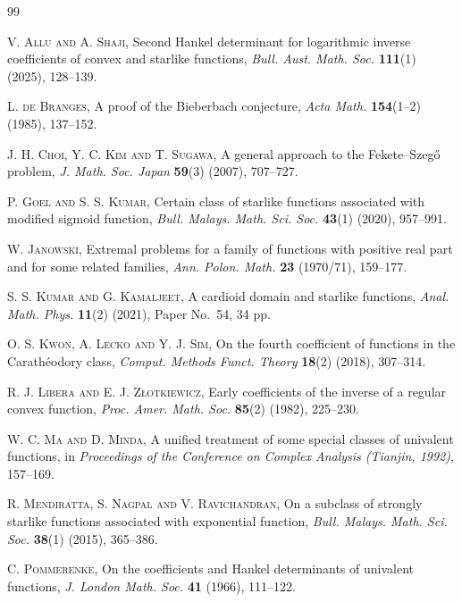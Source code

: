 \documentclass[a4paper,12pt,reqno]{amsart} %
\numberwithin{equation}{section}
\theoremstyle{definition}
\begin{document}
\begin{thebibliography}{99}
	
	\textsc{V. Allu and A. Shaji},
	Second Hankel determinant for logarithmic inverse coefficients of convex and starlike functions,
	\textit{Bull. Aust. Math. Soc.} \textbf{111}(1) (2025), 128--139.
	
	\textsc{L. de Branges},
	A proof of the Bieberbach conjecture,
	\textit{Acta Math.} \textbf{154}(1--2) (1985), 137--152.
	
	\textsc{J. H. Choi, Y. C. Kim and T. Sugawa},
	A general approach to the Fekete--Szeg\H{o} problem,
	\textit{J. Math. Soc. Japan} \textbf{59}(3) (2007), 707--727.
	
	\textsc{P. Goel and S. S. Kumar},
	Certain class of starlike functions associated with modified sigmoid function,
	\textit{Bull. Malays. Math. Sci. Soc.} \textbf{43}(1) (2020), 957--991.
	
	\textsc{W. Janowski},
	Extremal problems for a family of functions with positive real part and for some related families,
	\textit{Ann. Polon. Math.} \textbf{23} (1970/71), 159--177.
	
	\textsc{S. S. Kumar and G. Kamaljeet},
	A cardioid domain and starlike functions,
	\textit{Anal. Math. Phys.} \textbf{11}(2) (2021), Paper No.~54, 34 pp.
	
	\textsc{O. S. Kwon, A. Lecko and Y. J. Sim},
	On the fourth coefficient of functions in the Carath\'eodory class,
	\textit{Comput. Methods Funct. Theory} \textbf{18}(2) (2018), 307--314.
	
	\textsc{R. J. Libera and E. J. Z{\l}otkiewicz},
	Early coefficients of the inverse of a regular convex function,
	\textit{Proc. Amer. Math. Soc.} \textbf{85}(2) (1982), 225--230.
	
	\textsc{W. C. Ma and D. Minda},
	A unified treatment of some special classes of univalent functions,
	in \textit{Proceedings of the Conference on Complex Analysis (Tianjin, 1992)}, 157--169.
	
	\textsc{R. Mendiratta, S. Nagpal and V. Ravichandran},
	On a subclass of strongly starlike functions associated with exponential function,
	\textit{Bull. Malays. Math. Sci. Soc.} \textbf{38}(1) (2015), 365--386.
	
	\textsc{C. Pommerenke},
	On the coefficients and Hankel determinants of univalent functions,
	\textit{J. London Math. Soc.} \textbf{41} (1966), 111--122.
	

\end{thebibliography}
\end{document}
